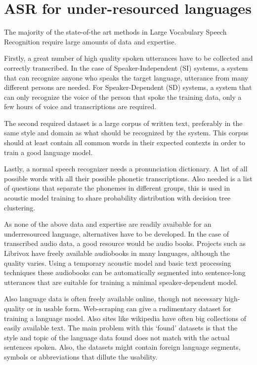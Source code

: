 \documentclass[b5paper]{article}
\begin{document}
\section{ASR for under-resourced languages}
The majority of the state-of-the art methods in Large Vocabulary Speech Recognition require large amounts of data and expertise. 

Firstly, a great number of high quality spoken utterances have to be collected and correctly transcribed. In the case of Speaker-Independent (SI) systems, a system that can recognize anyone who speaks the target language, utterance from many different persons are needed. For Speaker-Dependent (SD) systems, a system that can only recognize the voice of the person that spoke the training data, only a few hours of voice and transcriptions are required.

The second required dataset is a large corpus of written text, preferably in the same style and domain as what should be recognized by the system. This corpus should at least contain all common words in their expected contexts in order to train a good language model.

Lastly, a normal speech recognizer needs a pronunciation dictionary. A list of all possible words with all their possible phonetic transcriptions. Also needed is a list of questions that separate the phonemes in different groups, this is used in acoustic model training to share probability distribution with decision tree clustering.

As none of the above data and expertise are readily avaibable for an underresourced language, alternatives have to be developed. In the case of transcribed audio data, a good resource would be audio books. Projects such as Librivox have freely available audiobooks in many languages, although the quality varies. Using a temporary acoustic model and basic text processing techniques these audiobooks can be automatically segmented into sentence-long utterances that are suitable for training a minimal speaker-dependent model.

Also language data is often freely available online, though not necessary high-quality or in usable form. Web-scraping \cite{scannell2007crubadan} can give a rudimentary dataset for training a language model. Also sites like wikipedia have often big collections of easily available text. The main problem with this `found' datasets is that the style and topic of the language data found does not match with the actual sentences spoken. Also, the datasets might contain foreign language segments, symbols or abbreviations that dillute the usability.
\end{document}
